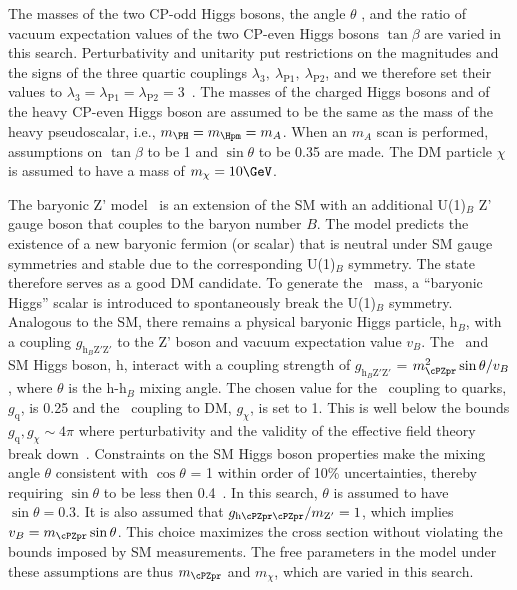 {The masses of the two CP-odd Higgs bosons, the angle $\theta$ , and the ratio of vacuum
expectation values of the two CP-even Higgs bosons $\tan\beta$ are varied in this search. 
Perturbativity and unitarity put restrictions on the magnitudes and the
signs of the three quartic couplings
$\lambda_3,~\lambda_{\mathrm{P}1},~\lambda_{\mathrm{P}2}$,
and we therefore set their values to $\lambda_3=\lambda_{\mathrm{P}1}=\lambda_{\mathrm{P}2}=3$~\cite{Bauer2017}. The masses of the charged Higgs bosons and of the heavy CP-even Higgs boson are assumed to be the same as the mass of the heavy pseudoscalar, i.e., $m_{\PH}=m_{\Hpm}=m_{A}$. When an $m_{A}$ scan is performed, assumptions on $\tan\beta$ to be 1 and $\sin\theta$ to be 0.35 are made. The DM particle $\chi$ is assumed to have a mass of $m_\chi=10\GeV$.


The baryonic Z' model~\cite{PhysRevD.89.075017} is an extension of the SM with an additional U(1)$_{B}$ Z' gauge 
boson that couples to the baryon number $B$. The model predicts the existence of a new baryonic fermion (or scalar) that is neutral under SM gauge symmetries and stable due to the corresponding U(1)$_{B}$ symmetry. The state therefore serves as a good DM candidate.
To generate the  \cPZpr\ mass, a ``baryonic Higgs'' scalar is introduced to 
spontaneously break the U(1)$_B$ symmetry. Analogous to the SM, there remains 
a physical baryonic Higgs particle, h$_{B}$, with a coupling  $g_{\mathrm{h}_{B}\mathrm{Z'Z'}}$ to the Z' boson
and vacuum expectation value $v_{B}$. 
The \cPZpr\ and SM Higgs boson, h, interact with a coupling strength of 
$g_{\mathrm{h}_{B}\mathrm{Z'Z'}}$ = $m_{\cPZpr}^{2} \sin \theta/v_{B}$, where $\theta$ is the h-h$_{B}$ 
mixing angle. The chosen value for the \cPZpr\ coupling to quarks,
$g_\text{q}$, is 0.25 and the \cPZpr\ coupling to DM, $g_\chi$, is set to 1. This is well below the bounds $g_\text{q},g_\chi\sim4\pi$ where perturbativity and the validity of the effective field theory break down~\cite{PhysRevD.89.075017}. Constraints on the SM Higgs boson properties make the mixing angle $\theta$ consistent with $\cos\theta$ = 1 within order of 10\% uncertainties, thereby requiring  $\sin\theta$ to be less then 0.4~\cite{PhysRevD.89.075017}. In this search, $\theta$ is assumed to have $\sin\theta= 0.3$. It is also assumed that $g_{\text{h}\cPZpr\cPZpr}/m_{\mathrm{Z}'}=1$, which implies $v_B=m_{\cPZpr}\sin\theta$. This choice maximizes the cross section without violating the bounds imposed by SM measurements. The free parameters in the model under these assumptions are thus $m_{\cPZpr}$ and $m_\chi$, which are varied in this search.

}
